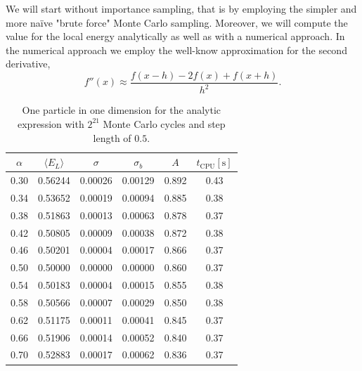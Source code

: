 \documentclass[
    a4paper, aps, twocolumn, floatfix, superscriptaddress, nofootinbib]{revtex4-1}
\newcommand{\1}{\mathds{1}}
\begin{document}
        We will start without importance sampling, that is by employing the
        simpler and more naïve "brute force" Monte Carlo sampling. Moreover, we
        will compute the value for the local energy analytically as well as with
        a numerical approach.  In the numerical approach we employ the well-know
        approximation for the second derivative,
        \begin{equation}
                f''(x) \approx \frac{f(x-h) - 2f(x) + f(x+h)}{h^2}.
        \end{equation}

        \begin{table}
            \centering
            \caption{One particle in one dimension for the analytic expression
            with $2^{21}$ Monte Carlo cycles and step length of $0.5$.}
            \begin{ruledtabular}
                \begin{tabular}{cccccc}
                    $\alpha$ & $\langle  E_L\rangle$ & $\sigma$ & $\sigma_b$
                    & $A$ & $t_{\text{CPU}} [\si{\second}]$ \\
                    \hline
                    0.30&0.56244&0.00026&0.00129&0.892&0.43\\
                    0.34&0.53652&0.00019&0.00094&0.885&0.38\\
                    0.38&0.51863&0.00013&0.00063&0.878&0.37\\
                    0.42&0.50805&0.00009&0.00038&0.872&0.38\\
                    0.46&0.50201&0.00004&0.00017&0.866&0.37\\
                    0.50&0.50000&0.00000&0.00000&0.860&0.37\\
                    0.54&0.50183&0.00004&0.00015&0.855&0.38\\
                    0.58&0.50566&0.00007&0.00029&0.850&0.38\\
                    0.62&0.51175&0.00011&0.00041&0.845&0.37\\
                    0.66&0.51906&0.00014&0.00052&0.840&0.37\\
                    0.70&0.52883&0.00017&0.00062&0.836&0.37\\
                \end{tabular}
            \end{ruledtabular}
            \label{tab:1D1N_analytic}
        \end{table}
\end{document}
